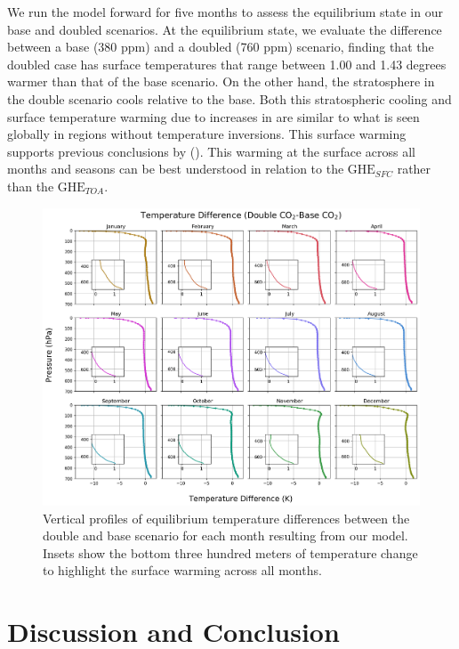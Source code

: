 \documentclass[draft]{agujournal2019}
\begin{document}
We run the model forward for five months to assess the equilibrium state in our base and doubled  scenarios. At the equilibrium state, we evaluate the difference between a base (380 ppm) and a doubled (760 ppm)  scenario, finding that the doubled case has surface temperatures that range between 1.00 and 1.43 degrees warmer than that of the base scenario. On the other hand, the stratosphere in the double scenario cools relative to the base. Both this stratospheric cooling and surface temperature warming due to increases in  are similar to what is seen globally in regions without temperature inversions. This surface warming supports previous conclusions by (\cite{flanner_climate_2018}). This warming at the surface across all months and seasons can be best understood in relation to the $\text{GHE}_{SFC}$ rather than the $\text{GHE}_{TOA}$.

\begin{figure}[htb!]
\noindent\includegraphics[width=1\textwidth]{figures/temp_dif.png}
\centering
\caption{Vertical profiles of equilibrium temperature differences between the double and base  scenario for each month resulting from our model. Insets show the bottom three hundred meters of temperature change to highlight the surface warming across all months.}
\label{fig:temp_dif}
\end{figure}


\section{Discussion and Conclusion} 
%
\end{document}
